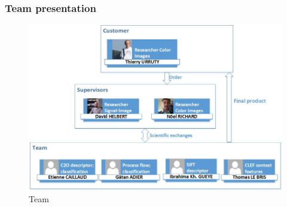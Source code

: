 \documentclass[xcolor=table]{beamer}
\begin{document}
\begin{frame} \frametitle{Team presentation}

\begin{figure}[h]
    \center
    \includegraphics[scale=0.45]{Dessin1.jpg}
    \caption{Team}\label{fig:team}
\end{figure}

\end{frame}




\end{document}
